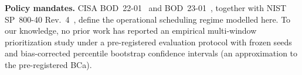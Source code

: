 \textbf{Policy mandates.} CISA BOD~22-01~\cite{cisa2021bod2201} and BOD~23-01~\cite{cisa2022bod2301}, together with NIST SP~800-40 Rev.~4~\cite{nist2022sp80040r4}, define the operational scheduling regime modelled here. To our knowledge, no prior work has reported an empirical multi-window prioritization study under a pre-registered evaluation protocol with frozen seeds and bias-corrected percentile bootstrap confidence intervals (an approximation to the pre-registered BCa).
